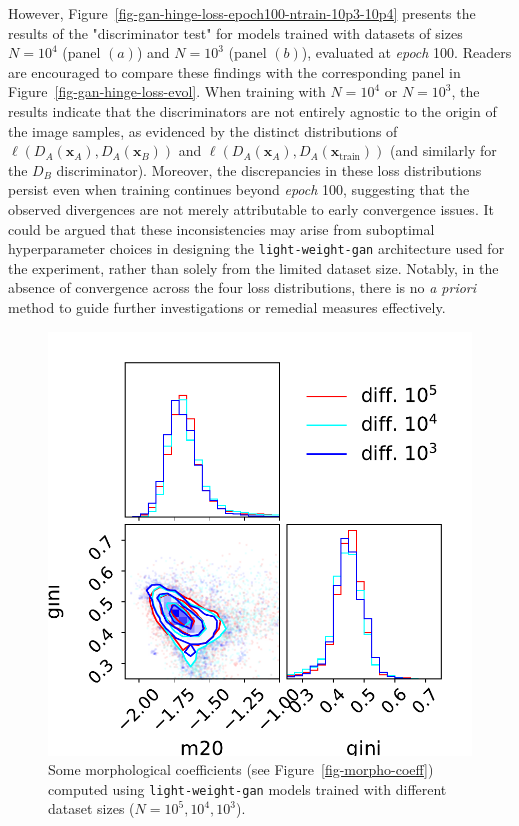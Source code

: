 \documentclass[fleqn,usenatbib]{mnras}
\begin{document}
However, Figure~\ref{fig-gan-hinge-loss-epoch100-ntrain-10p3-10p4} presents the results of the "discriminator test" for models trained with datasets of sizes $N=10^4$ (panel $(a)$) and $N=10^3$ (panel $(b)$), evaluated at \textit{epoch} 100. Readers are encouraged to compare these findings with the corresponding panel in Figure~\ref{fig-gan-hinge-loss-evol}. When training with $N=10^4$ or $N=10^3$, the results indicate that the discriminators are not entirely agnostic to the origin of the image samples, as evidenced by the distinct distributions of $\ell(D_A(\bm{x}_A), D_A(\bm{x}_B))$ and \(\ell(D_A(\bm{x}_A), D_A(\bm{x}_{\text{train}}))\) (and similarly for the $D_B$ discriminator). 
Moreover, the discrepancies in these loss distributions persist even when training continues beyond \textit{epoch} 100, suggesting that the observed divergences are not merely attributable to early convergence issues. It could be argued that these inconsistencies may arise from suboptimal hyperparameter choices in designing the \texttt{light-weight-gan} architecture used for the experiment, rather than solely from the limited dataset size. Notably, in the absence of convergence across the four loss distributions, there is no \textit{a priori} method to guide further investigations or remedial measures effectively.
%
\begin{figure}
    \centering
	\includegraphics[width=0.7\linewidth]{fig-gini-m20-gan-compare_0.pdf}
	\caption{Some morphological coefficients (see Figure~\ref{fig-morpho-coeff}) computed using \texttt{light-weight-gan} models trained with different dataset sizes ($N=10^5, 10^4, 10^3$).}
	\label{fig-morpho-coeff-gan-comparison}
\end{figure}
\end{document}
